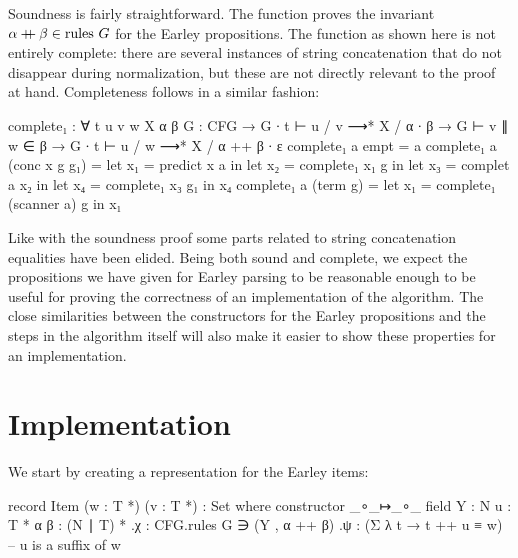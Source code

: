 		Soundness is fairly straightforward. The  function proves
		the invariant $\alpha \mathbin{{+}\mspace{-8mu}{+}} \beta \in \textrm{rules } G$ for the
		Earley propositions. The function as shown here is not entirely
		complete: there are several instances of string concatenation that do
		not disappear during normalization, but these are not directly relevant
		to the proof at hand. Completeness follows in a similar fashion:

		\begin{code}
			complete₁ : ∀ {t u v w X α β} {G : CFG} →
			  G ∙ t ⊢ u / v ⟶* X / α ∙ β →
			    G ⊢ v ∥ w ∈ β →
			  G ∙ t ⊢ u / w ⟶* X / α ++ β ∙ ε
			complete₁ a empt = a
			complete₁ a (conc x g g₁) =
			  let x₁ = predict x a in
			  let x₂ = complete₁ x₁ g in
			  let x₃ = complet a x₂ in
			  let x₄ = complete₁ x₃ g₁ in
			  x₄
			complete₁ a (term g) =
			  let x₁ = complete₁ (scanner a) g in
			  x₁
		\end{code}

		Like with the soundness proof some parts related to string
		concatenation equalities have been elided. Being both sound and
		complete, we expect the propositions we have given for Earley parsing
		to be reasonable enough to be useful for proving the correctness of an
		implementation of the algorithm. The close similarities between the
		constructors for the Earley propositions and the steps in the algorithm
		itself will also make it easier to show these properties for an
		implementation.

	\section{Implementation}

		We start by creating a representation for the Earley items:

		\begin{code}
			  record Item (w : T *) (v : T *) : Set where
			    constructor _∘_↦_∘_
			    field
			      Y : N
			      u : T *
			      α β : (N ∣ T) *
			      .{χ} : CFG.rules G ∋ (Y , α ++ β)
			      .{ψ} : (Σ λ t → t ++ u ≡ w)        -- u is a suffix of w
		\end{code}

